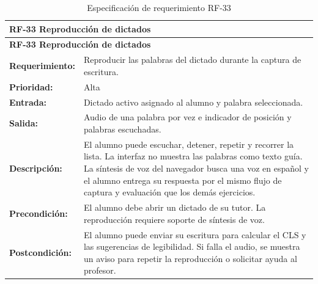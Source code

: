 \begin{longtable}{|p{3.2cm}|p{11.8cm}|}
\caption{Especificación de requerimiento RF-33}\label{tab:rf33} \\ \hline
\multicolumn{2}{|p{15cm}|}{\textbf{RF-33 Reproducción de dictados}} \\ \hline
\endfirsthead
\hline
\multicolumn{2}{|p{15cm}|}{\textbf{RF-33 Reproducción de dictados}} \\ \hline
\endhead
\textbf{Requerimiento:} & Reproducir las palabras del dictado durante la captura de escritura. \\ \hline
\textbf{Prioridad:} & Alta \\ \hline
\textbf{Entrada:} & Dictado activo asignado al alumno y palabra seleccionada. \\ \hline
\textbf{Salida:} & Audio de una palabra por vez e indicador de posición y palabras escuchadas. \\ \hline
\textbf{Descripción:} & El alumno puede escuchar, detener, repetir y recorrer la lista. La interfaz no muestra las palabras como texto guía. La síntesis de voz del navegador busca una voz en español y el alumno entrega su respuesta por el mismo flujo de captura y evaluación que los demás ejercicios. \\ \hline
\textbf{Precondición:} & El alumno debe abrir un dictado de su tutor. La reproducción requiere soporte de síntesis de voz. \\ \hline
\textbf{Postcondición:} & El alumno puede enviar su escritura para calcular el CLS y las sugerencias de legibilidad. Si falla el audio, se muestra un aviso para repetir la reproducción o solicitar ayuda al profesor. \\ \hline
\end{longtable}

